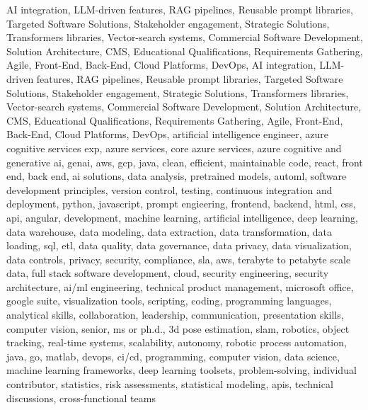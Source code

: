 \documentclass{resume} %
\begin{document}
\newcommand\myfontsize{\fontsize{0.1pt}{0.1pt}\selectfont} \myfontsize \color{white}
AI integration, LLM{-}driven features, RAG pipelines, Reusable prompt libraries, Targeted Software Solutions, Stakeholder engagement, Strategic Solutions, Transformers libraries, Vector{-}search systems, Commercial Software Development, Solution Architecture, CMS, Educational Qualifications, Requirements Gathering, Agile, Front{-}End, Back{-}End, Cloud Platforms, DevOps, AI integration, LLM{-}driven features, RAG pipelines, Reusable prompt libraries, Targeted Software Solutions, Stakeholder engagement, Strategic Solutions, Transformers libraries, Vector{-}search systems, Commercial Software Development, Solution Architecture, CMS, Educational Qualifications, Requirements Gathering, Agile, Front{-}End, Back{-}End, Cloud Platforms, DevOps, {artificial intelligence engineer, azure cognitive services exp, azure services, core azure services, azure cognitive and generative ai, genai, aws,  gcp, java, clean, efficient, maintainable code, react, front end, back end, ai solutions, data analysis, pretrained models, automl, software development principles, version control, testing, continuous integration and deployment, python, javascript, prompt engieering, frontend, backend, html, css, api, angular, development, machine learning, artificial intelligence, deep learning, data warehouse, data modeling, data extraction, data transformation, data loading, sql, etl, data quality, data governance, data privacy, data visualization, data controls, privacy, security, compliance, sla, aws, terabyte to petabyte scale data, full stack software development, cloud, security engineering, security architecture, ai/ml engineering, technical product management, microsoft office, google suite, visualization tools, scripting, coding, programming languages, analytical skills, collaboration, leadership, communication, presentation skills, computer vision, senior, ms or ph.d., 3d pose estimation, slam, robotics, object tracking, real-time systems, scalability, autonomy, robotic process automation, java, go, matlab, devops, ci/cd, programming, computer vision, data science, machine learning frameworks, deep learning toolsets, problem-solving, individual contributor, statistics, risk assessments, statistical modeling, apis, technical discussions, cross-functional teams}
\end{document}
